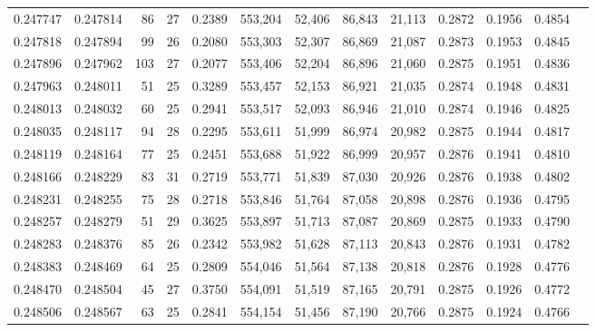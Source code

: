 \begin{tabular}{rrrrrrrrrrrrr}
0.247747 & 0.247814 &  86 &  27 &                                     0.2389 & 553,204 &  52,406 &  86,843 &  21,113 & 0.2872 & 0.1956 & 0.4854 \\
0.247818 & 0.247894 &  99 &  26 &                                     0.2080 & 553,303 &  52,307 &  86,869 &  21,087 & 0.2873 & 0.1953 & 0.4845 \\
0.247896 & 0.247962 & 103 &  27 &                                     0.2077 & 553,406 &  52,204 &  86,896 &  21,060 & 0.2875 & 0.1951 & 0.4836 \\
0.247963 & 0.248011 &  51 &  25 &                                     0.3289 & 553,457 &  52,153 &  86,921 &  21,035 & 0.2874 & 0.1948 & 0.4831 \\
0.248013 & 0.248032 &  60 &  25 &                                     0.2941 & 553,517 &  52,093 &  86,946 &  21,010 & 0.2874 & 0.1946 & 0.4825 \\
0.248035 & 0.248117 &  94 &  28 &                                     0.2295 & 553,611 &  51,999 &  86,974 &  20,982 & 0.2875 & 0.1944 & 0.4817 \\
0.248119 & 0.248164 &  77 &  25 &                                     0.2451 & 553,688 &  51,922 &  86,999 &  20,957 & 0.2876 & 0.1941 & 0.4810 \\
0.248166 & 0.248229 &  83 &  31 &                                     0.2719 & 553,771 &  51,839 &  87,030 &  20,926 & 0.2876 & 0.1938 & 0.4802 \\
0.248231 & 0.248255 &  75 &  28 &                                     0.2718 & 553,846 &  51,764 &  87,058 &  20,898 & 0.2876 & 0.1936 & 0.4795 \\
0.248257 & 0.248279 &  51 &  29 &                                     0.3625 & 553,897 &  51,713 &  87,087 &  20,869 & 0.2875 & 0.1933 & 0.4790 \\
0.248283 & 0.248376 &  85 &  26 &                                     0.2342 & 553,982 &  51,628 &  87,113 &  20,843 & 0.2876 & 0.1931 & 0.4782 \\
0.248383 & 0.248469 &  64 &  25 &                                     0.2809 & 554,046 &  51,564 &  87,138 &  20,818 & 0.2876 & 0.1928 & 0.4776 \\
0.248470 & 0.248504 &  45 &  27 &                                     0.3750 & 554,091 &  51,519 &  87,165 &  20,791 & 0.2875 & 0.1926 & 0.4772 \\
0.248506 & 0.248567 &  63 &  25 &                                     0.2841 & 554,154 &  51,456 &  87,190 &  20,766 & 0.2875 & 0.1924 & 0.4766 \\

\end{tabular}
